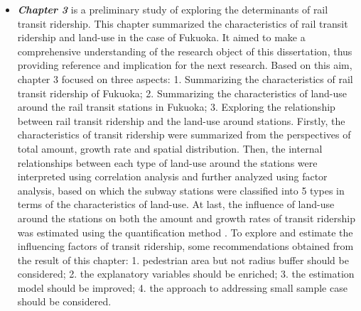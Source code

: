\begin{itemize}
	\item \emph{\textbf{Chapter 3}} is a preliminary study of exploring the determinants of rail transit ridership. This chapter	summarized the characteristics of rail transit ridership and land-use in the case of Fukuoka. It aimed to make a comprehensive understanding of the research object of this dissertation, thus providing reference and implication for the next research. Based on this aim, chapter 3 focused on three aspects: 1. Summarizing the characteristics of rail transit ridership of Fukuoka; 2. Summarizing the characteristics of land-use around the rail transit stations in Fukuoka; 3. Exploring the relationship between rail transit ridership and the land-use around stations. Firstly, the characteristics of transit ridership were summarized from the perspectives of total amount, growth rate and spatial distribution. Then, the internal relationships between each type of land-use around the stations were interpreted using correlation analysis and further analyzed using factor analysis, based on which the subway stations were classified into 5 types in terms of the characteristics of land-use. At last, the influence of land-use around the stations on both the amount and growth rates of transit ridership was estimated using the quantification method \uppercase\expandafter{}. To explore and estimate the influencing factors of transit ridership, some recommendations obtained from the result of this chapter: 1. pedestrian area but not radius buffer should be considered; 2. the explanatory variables should be enriched; 3. the estimation model should be improved; 4. the approach to addressing small sample case should be considered.
	

\end{itemize}
